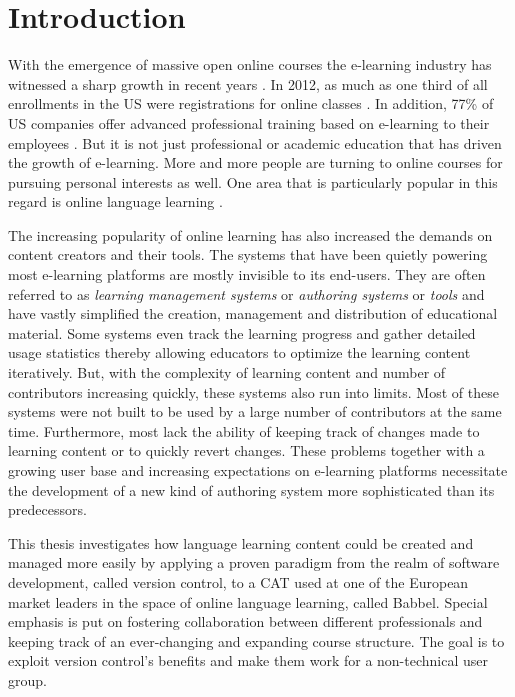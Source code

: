 \chapter{Introduction}
With the emergence of massive open online courses the e-learning industry has witnessed a sharp growth in recent years \cite{_e-learning_2014}. In 2012, as much as one third of all enrollments in the US were registrations for online classes \cite{allen_grade_2014}. In addition, 77\% of US companies offer advanced professional training based on e-learning to their employees \cite{vernau_corporate_2014}. But it is not just professional or academic education that has driven the growth of e-learning. More and more people are turning to online courses for pursuing personal interests as well. One area that is particularly popular in this regard is online language learning \cite{blake_current_2011} \cite{_its_2014}. 



The increasing popularity of online learning has also increased the demands on content creators and their tools. The systems that have been quietly powering most e-learning platforms are mostly invisible to its end-users. They are often referred to as \textit{learning management systems} or \textit{authoring systems} or \textit{tools} and have vastly simplified the creation, management and distribution of educational material. Some systems even track the learning progress and gather detailed usage statistics thereby allowing educators to optimize the learning content iteratively. But, with the complexity of learning content and number of contributors increasing quickly, these systems also run into limits. Most of these systems were not built to be used by a large number of contributors at the same time. Furthermore, most lack the ability of keeping track of changes made to learning content or to quickly revert changes. These problems together with a growing user base and increasing expectations on e-learning platforms necessitate the development of a new kind of authoring system more sophisticated than its predecessors.

This thesis investigates how language learning content could be created and managed more easily by applying a proven paradigm from the realm of software development, called version control, to a \ac{CAT} used at one of the European market leaders in the space of online language learning, called Babbel. Special emphasis is put on fostering collaboration between different professionals and keeping track of an ever-changing and expanding course structure. The goal is to exploit version control's benefits and make them work for a non-technical user group. 

